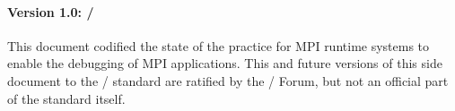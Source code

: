\paragraph{Version 1.0: \MEMALLOCDATE/} This document codified the state
of the practice for MPI runtime systems to enable the debugging of MPI
applications. This and future versions of this side document to the \MPI/
standard are ratified by the \MPI/ Forum, but not an official part of the
standard itself.
